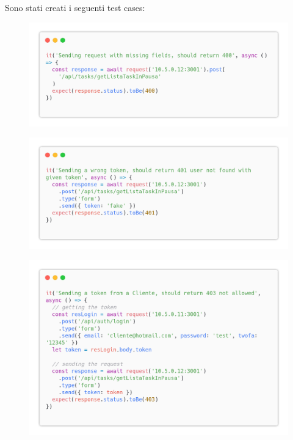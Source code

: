 \documentclass{report}
\begin{document}
Sono stati creati i seguenti test cases:
\begin{figure}[H]
	\centering\includegraphics[width=1\textwidth]{images/code_in_pausa_test1.png}
\end{figure}
\begin{figure}[H]
	\centering\includegraphics[width=1\textwidth]{images/code_in_pausa_test2.png}
\end{figure}
\begin{figure}[H]
	\centering\includegraphics[width=1\textwidth]{images/code_in_pausa_test3.png}
\end{figure}
\end{document}
